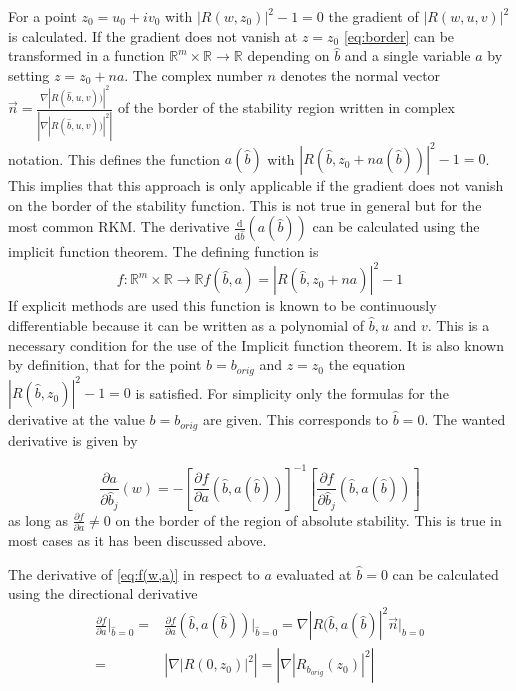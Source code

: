 \documentclass[a4paper]{article}
\numberwithin{equation}{section}
\theoremstyle{plain}
\theoremstyle{definition}
\numberwithin{theorem}{section}
\newcommand{\R}{\mathbb{R}}
\newcommand{\1}{\mathbbm{1}}
\begin{document}
For a point $z_0= u_0 +i v_0 $ 
with $ |R(w,z_0)|^2 -1 = 0 $ the gradient of
 $|R(w,u,v)|^2$ is calculated. 
If the gradient does not vanish at $z = z_0$ \eqref{eq:border} can be transformed in a function $\R^m \times \R \rightarrow \R$ depending on $\hat{b}$ and a single variable $a$ by setting $z = z_0 + n a$. The complex number $n$ denotes the normal vector $\vec{n} = \frac{\nabla |R(\hat{b},u,v))|^2}{\left| \nabla |R(\hat{b},u,v))|^2 \right|}$ of the border of the stability region written in complex notation. This defines the function $a(\hat{b})$ with $|R(\hat{b},z_0 + n a(\hat{b}))|^2 -1 = 0$. 
This implies that this approach is only applicable if the gradient does not vanish on the border of the stability function. This is not true in general but for the most common RKM. 
The derivative $\frac{\mathrm d}{\mathrm d \hat{b}} (a(\hat{b}))$ can be calculated using the implicit function theorem. The defining function is 
\begin{equation}\label{eq:f(w,a)}
f: \R^m \times \R \rightarrow \R f(\hat{b},a) = |R(\hat{b},z_0 + n a)|^2 -1 
\end{equation}
If explicit methods are used this function is known to be continuously differentiable because it can be written as a polynomial of $\hat{b},u$ and $v$. This is a necessary condition for the use of the Implicit function theorem. 
It is also known by definition, that for the point $b = b_{orig}$ and $z = z_0$ the equation $ |R(\hat{b},z_0)|^2 -1 = 0 $ is satisfied.
For simplicity only the formulas for the derivative at the value $b = b_{orig}$ are given. This corresponds to $\hat{b} = 0$.
The wanted derivative is given by 

\begin{equation}
 \frac{\partial a}{\partial \hat{b}_j} (w) =
 - \left[ \frac{\partial f}{\partial a} (\hat{b},a(\hat{b}))  \right] ^{-1} 
   \left[ \frac{\partial f}{\partial \hat{b}_j}(\hat{b},a(\hat{b})) \right]
\end{equation}
as long as $\frac{\partial f}{\partial a} \neq 0$ on the border of the region of absolute stability. This is true in most cases as it has been discussed above.

The derivative of \eqref{eq:f(w,a)} in respect to $a$ evaluated at $\hat{b}=0$ can be calculated using the directional derivative
\begin{align*}
 \frac{\partial f}{\partial a} \Big|_{\hat{b}=0} =& 
 \frac{\partial f}{\partial a} (\hat{b},a(\hat{b})) \Big|_{\hat{b}=0} = 
 \nabla |R(\hat{b},a(\hat{b})|^2 \vec{n} \Big|_{\hat{b}=0} \\
=& \left| \nabla|R(0,z_0)|^2 \right| = \left| \nabla|R_{b_{orig}}(z_0)|^2 \right|
\end{align*} 
\end{document}
